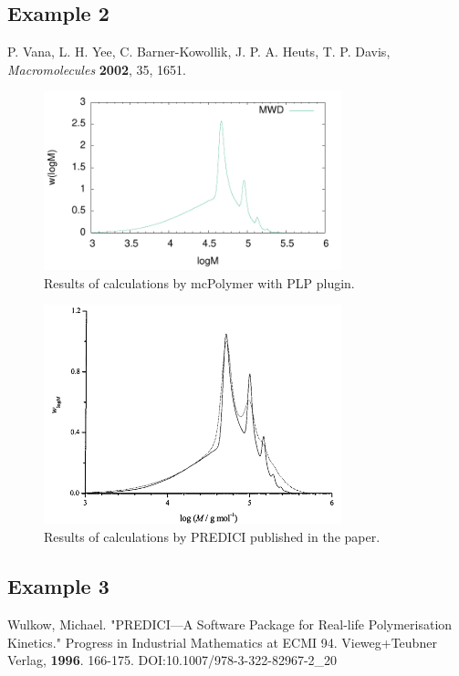 \documentclass{article}
\begin{document}
\subsection*{Example 2}

P. Vana, L. H. Yee, C. Barner-Kowollik, J. P. A. Heuts, T. P. Davis, \textit{Macromolecules} \textbf{2002}, 35, 1651.

\begin{figure}[h]
\centering
\includegraphics[width=0.77\textwidth]{plp_example2.pdf}
\caption{Results of calculations by mcPolymer with PLP plugin.}
\end{figure}

\begin{figure}[h]
\centering
\includegraphics[width=0.77\textwidth]{Vana2002_PLP.png}
\caption{Results of calculations by PREDICI published in the paper.}
\end{figure}

\vspace{5mm}

\subsection*{Example 3}
Wulkow, Michael. "PREDICI—A Software Package for Real-life Polymerisation Kinetics." Progress in Industrial Mathematics at ECMI 94. Vieweg+Teubner Verlag, \textbf{1996}. 166-175. DOI:10.1007/978-3-322-82967-2\_20
\end{document}
